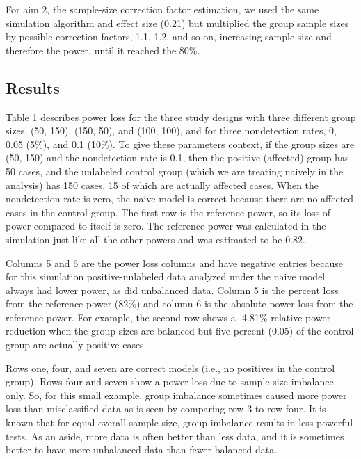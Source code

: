 \documentclass[
]{article}
\begin{document}
For aim 2, the sample-size correction factor estimation, we used the
same simulation algorithm and effect size (0.21) but multiplied the
group sample sizes by possible correction factors, 1.1, 1.2, and so on,
increasing sample size and therefore the power, until it reached the
80\%.

\pagebreak

\hypertarget{results-1}{%
\subsection{Results}\label{results-1}}

Table 1 describes power loss for the three study designs with three
different group sizes, (50, 150), (150, 50), and (100, 100), and for
three nondetection rates, 0, 0.05 (5\%), and 0.1 (10\%). To give these
parameters context, if the group sizes are (50, 150) and the
nondetection rate is 0.1, then the positive (affected) group has 50
cases, and the unlabeled control group (which we are treating naively in
the analysis) has 150 cases, 15 of which are actually affected cases.
When the nondetection rate is zero, the naive model is correct because
there are no affected cases in the control group. The first row is the
reference power, so its loss of power compared to itself is zero. The
reference power was calculated in the simulation just like all the other
powers and was estimated to be 0.82.

Columns 5 and 6 are the power loss columns and have negative entries
because for this simulation positive-unlabeled data analyzed under the
naive model always had lower power, as did unbalanced data. Column 5 is
the percent loss from the reference power (82\%) and column 6 is the
absolute power loss from the reference power. For example, the second
row shows a -4.81\% relative power reduction when the group sizes are
balanced but five percent (0.05) of the control group are actually
positive cases.

Rows one, four, and seven are correct models (i.e., no positives in the
control group). Rows four and seven show a power loss due to sample size
imbalance only. So, for this small example, group imbalance sometimes
caused more power loss than misclassified data as is seen by comparing
row 3 to row four. It is known that for equal overall sample size, group
imbalance results in less powerful tests. As an aside, more data is
often better than less data, and it is sometimes better to have more
unbalanced data than fewer balanced data.
\end{document}
